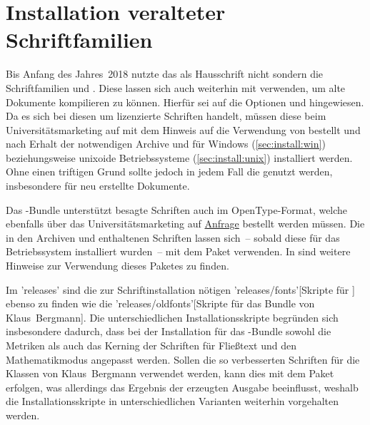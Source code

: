 \section{%
  Installation veralteter Schriftfamilien%
  \label{sec:install:fonts}%
}
%
Bis Anfang des Jahres~2018 nutzte das \TUDCD als Hausschrift nicht \OpenSans 
sondern die Schriftfamilien \Univers und \DIN. Diese lassen sich auch weiterhin 
mit \TUDScript verwenden, um alte Dokumente kompilieren zu können. Hierfür sei 
auf die Optionen  und  hingewiesen. 
Da es sich bei diesen um lizenzierte Schriften handelt, müssen diese beim 
Universitätsmarketing auf  mit dem 
Hinweis auf die Verwendung von  bestellt und nach Erhalt der 
notwendigen Archive  und  für 
Windows (\autoref{sec:install:win}) beziehungsweise unixoide Betriebssysteme 
(\autoref{sec:install:unix}) installiert werden. Ohne einen triftigen Grund 
sollte jedoch in jedem Fall die \OpenSans genutzt werden, insbesondere für neu 
erstellte Dokumente.

Das \TUDScript-Bundle unterstützt besagte Schriften auch im OpenType-Format, 
welche ebenfalls über das Universitätsmarketing auf 
\href{https://tu-dresden.de/cd}{Anfrage} bestellt werden müssen. Die in den 
Archiven  und  enthaltenen 
Schriften lassen sich~-- sobald diese für das Betriebssystem installiert 
wurden~-- mit dem Paket  verwenden. In  
sind weitere Hinweise zur Verwendung dieses Paketes zu finden.

Im \GitHubRepo'releases' sind die zur Schriftinstallation nötigen 
\GitHubRepo'releases/fonts'[Skripte für \TUDScript] ebenso zu finden wie die
\GitHubRepo'releases/oldfonts'[Skripte für das Bundle von Klaus~Bergmann]. Die 
unterschiedlichen Installationsskripte begründen sich insbesondere dadurch, 
dass bei der Installation für das \TUDScript-Bundle sowohl die Metriken als 
auch das Kerning der Schriften für Fließtext und den Mathematikmodus angepasst 
werden. Sollen die so verbesserten Schriften für die Klassen von Klaus~Bergmann 
verwendet werden, kann dies mit dem Paket  erfolgen, 
was allerdings das Ergebnis der erzeugten Ausgabe beeinflusst, weshalb die 
Installationsskripte in unterschiedlichen Varianten weiterhin vorgehalten 
werden.


